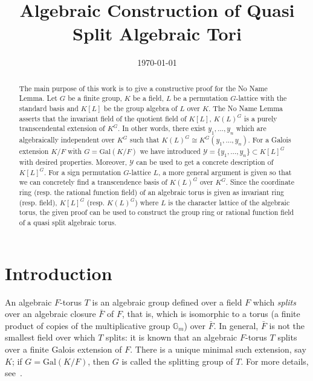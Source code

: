 \documentclass[12pt]{article}
\title{Algebraic Construction of Quasi Split Algebraic Tori}
\date{\today}
\theoremstyle{plain}
\begin{document}
\maketitle


\begin{abstract}

The main purpose of this work is to give a constructive proof for the No Name Lemma. Let $G$ be a finite group, $K$ be a field, $L$ be a permutation $G$-lattice with the standard basis and $K[L]$ be the group algebra of $L$ over $K$. The No Name Lemma asserts that the invariant field of the quotient field of $K[L]$, $K(L)^G$ is a purely transcendental extension of $K^G$. In other words, there exist $y_1, \ldots , y_n$ which are algebraically independent over $K^G$ such that $K(L)^G \cong K^G(y_1, \ldots , y_n)$. For a Galois extension $K/F$ with $G = \mathrm{Gal}(K/F)$ we have introduced $\mathcal{Y}=\lbrace y_1, \ldots, y_n \rbrace \subset K[L]^G$ with desired properties. Moreover, $\mathcal{Y}$ can be used to get a concrete description of $K[L]^G$. For a sign permutation $G$-lattice $L$, a more general argument is given so that we can concretely find a transcendence basis of $K(L)^G$ over $K^G$. Since the coordinate ring (resp. the rational function field) of an algebraic torus is given as invariant ring (resp. field), $K[L]^G$ (resp. $K(L)^G$) where $L$ is the character lattice of the algebraic torus, the given proof can be used to construct the group ring or rational function field of a quasi split algebraic torus.
\end{abstract}

\section{Introduction}



An algebraic $F$-torus $T$ is an algebraic group defined over a field
$F$ which {\em splits} over an algebraic closure $\bar F$ of $F$, that
is, which is isomorphic to a torus (a finite product of copies of the
multiplicative group $\mathbb{G}_m$) over $\bar{F}$. In general,
$\bar{F}$ is not the smallest field over which $T$ splits: it is known
that an algebraic $F$-torus $T$ splits over a finite Galois extension
of $F$. There is a unique minimal such extension, say $K$; if $G =
\mathrm{Gal}(K/F)$, then $G$ is called the splitting group of $T$. For
more details, see~\cite[Chapter 2]{Voskresenskii}.
\end{document}
